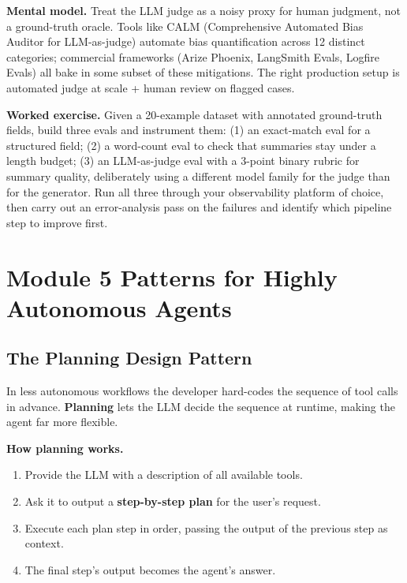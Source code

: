 \documentclass[a4paper,11pt]{article}
\begin{document}
\begin{ambercallout}
\textbf{Mental model.}
Treat the LLM judge as a noisy proxy for human judgment, not a
ground-truth oracle. Tools like CALM (Comprehensive Automated Bias
Auditor for LLM-as-judge) automate bias quantification across 12
distinct categories; commercial frameworks (Arize Phoenix, LangSmith
Evals, Logfire Evals) all bake in some subset of these mitigations.
The right production setup is automated judge at scale +
human review on flagged cases.
\end{ambercallout}

\begin{callout}
\textbf{Worked exercise.}
Given a 20-example dataset with annotated ground-truth fields, build
three evals and instrument them: (1) an exact-match eval for a
structured field; (2) a word-count eval to check that summaries stay
under a length budget; (3) an LLM-as-judge eval with a 3-point
binary rubric for summary quality, deliberately using a different
model family for the judge than for the generator. Run all three
through your observability platform of choice, then carry out an
error-analysis pass on the failures and identify which pipeline step
to improve first.
\end{callout}

\section{Module 5 \textemdash{} Patterns for Highly Autonomous Agents}

\subsection{The Planning Design Pattern}

In less autonomous workflows the developer hard-codes the sequence
of tool calls in advance. \textbf{Planning} lets the LLM decide the
sequence at runtime, making the agent far more flexible.

\textbf{How planning works.}
\begin{enumerate}[noitemsep, leftmargin=1.4em]
  \item Provide the LLM with a description of all available tools.
  \item Ask it to output a \textbf{step-by-step plan} for the user's
        request.
  \item Execute each plan step in order, passing the output of the
        previous step as context.
  \item The final step's output becomes the agent's answer.
\end{enumerate}
\end{document}
